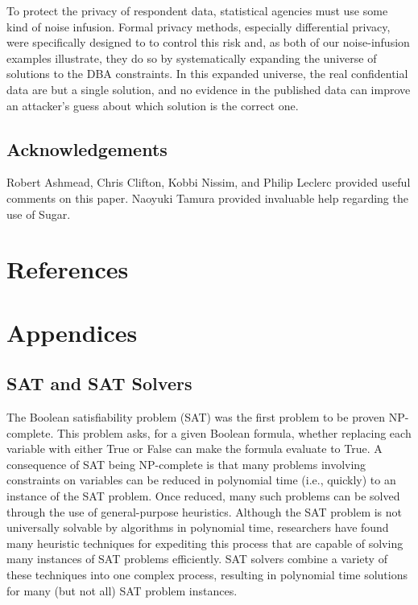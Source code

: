 \documentclass[runningheads]{llncs}
\begin{document}
To protect the privacy of respondent data, statistical agencies must
use some kind of noise infusion.  Formal privacy methods, especially
differential privacy, were specifically designed to to control this
risk and, as both of our noise-infusion examples illustrate, they do
so by systematically expanding the universe of solutions to the DBA
constraints. In this expanded universe, the real confidential data are
but a single solution, and no evidence in the published data can
improve an attacker's guess about which solution is the correct one.

\subsection{Acknowledgements}
Robert Ashmead, Chris Clifton, Kobbi Nissim, and Philip Leclerc provided useful
comments on this paper. Naoyuki Tamura provided invaluable help
regarding the use of Sugar.

\section{References}




\section{Appendices}

\subsection{SAT and SAT Solvers}

The Boolean satisfiability problem (SAT) was the first
problem to be proven NP-complete\cite{cooklevin}. This problem asks,
for a given Boolean formula, whether replacing each variable with
either True or False can make the formula evaluate to True.  A
consequence of SAT being NP-complete is that many problems involving
constraints on variables can be
reduced in polynomial time (i.e., quickly) to an instance of the SAT
problem. Once reduced, many such problems can be solved through the
use of general-purpose heuristics. Although the SAT problem is not universally solvable by
algorithms in polynomial time, researchers have found many heuristic
techniques for expediting this process that are capable of solving many instances of SAT problems efficiently. SAT solvers combine a variety
of these techniques into one complex process, resulting in polynomial
time solutions for many (but not all) SAT problem instances.
\end{document}
